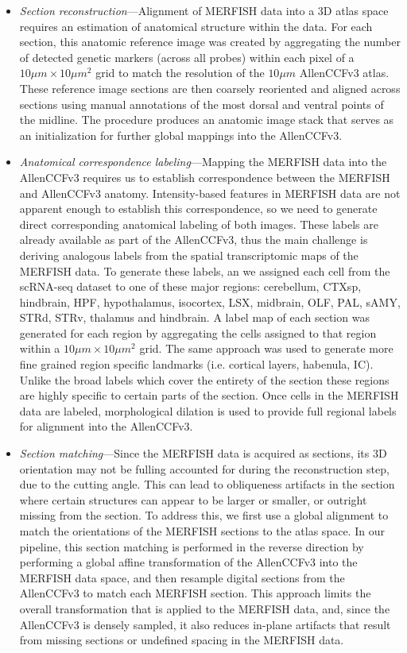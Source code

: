 \documentclass[
  12pt,
]{article}
\begin{document}
\begin{itemize}
\item
  \emph{Section reconstruction}---Alignment of MERFISH data into a 3D
  atlas space requires an estimation of anatomical structure within the
  data. For each section, this anatomic reference image was created by
  aggregating the number of detected genetic markers (across all probes)
  within each pixel of a \(10 \mu m \times 10 \mu m^2\) grid to match
  the resolution of the \(10 \mu m\) AllenCCFv3 atlas. These reference
  image sections are then coarsely reoriented and aligned across
  sections using manual annotations of the most dorsal and ventral
  points of the midline. The procedure produces an anatomic image stack
  that serves as an initialization for further global mappings into the
  AllenCCFv3.
\item
  \emph{Anatomical correspondence labeling}---Mapping the MERFISH data
  into the AllenCCFv3 requires us to establish correspondence between
  the MERFISH and AllenCCFv3 anatomy. Intensity-based features in
  MERFISH data are not apparent enough to establish this correspondence,
  so we need to generate direct corresponding anatomical labeling of
  both images. These labels are already available as part of the
  AllenCCFv3, thus the main challenge is deriving analogous labels from
  the spatial transcriptomic maps of the MERFISH data. To generate these
  labels, an we assigned each cell from the scRNA-seq dataset to one of
  these major regions: cerebellum, CTXsp, hindbrain, HPF, hypothalamus,
  isocortex, LSX, midbrain, OLF, PAL, sAMY, STRd, STRv, thalamus and
  hindbrain. A label map of each section was generated for each region
  by aggregating the cells assigned to that region within a
  \(10 \mu m \times 10 \mu m^2\) grid. The same approach was used to
  generate more fine grained region specific landmarks (i.e. cortical
  layers, habenula, IC). Unlike the broad labels which cover the
  entirety of the section these regions are highly specific to certain
  parts of the section. Once cells in the MERFISH data are labeled,
  morphological dilation is used to provide full regional labels for
  alignment into the AllenCCFv3.
\item
  \emph{Section matching}---Since the MERFISH data is acquired as
  sections, its 3D orientation may not be fulling accounted for during
  the reconstruction step, due to the cutting angle. This can lead to
  obliqueness artifacts in the section where certain structures can
  appear to be larger or smaller, or outright missing from the section.
  To address this, we first use a global alignment to match the
  orientations of the MERFISH sections to the atlas space. In our
  pipeline, this section matching is performed in the reverse direction
  by performing a global affine transformation of the AllenCCFv3 into
  the MERFISH data space, and then resample digital sections from the
  AllenCCFv3 to match each MERFISH section. This approach limits the
  overall transformation that is applied to the MERFISH data, and, since
  the AllenCCFv3 is densely sampled, it also reduces in-plane artifacts
  that result from missing sections or undefined spacing in the MERFISH
  data.
\end{itemize}
\end{document}
